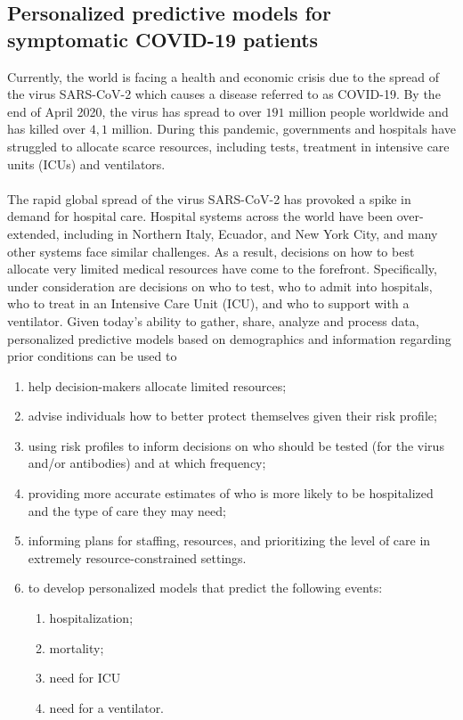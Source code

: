 \documentclass[11pt,a4paper]{article}
\begin{document}
\subsection{Personalized predictive models for symptomatic COVID-19 patients}
Currently, the world is facing a health and economic crisis due to the spread of
the virus SARS-CoV-2 which causes a disease referred to as COVID-19. By the end
of April 2020, the virus has spread to over $191$ million people worldwide and
has killed over $4,1$ million. During this pandemic, governments and hospitals
have struggled to allocate scarce resources, including tests, treatment in
intensive care units (ICUs) and ventilators.\\
\\
The rapid global spread of the virus SARS-CoV-2 has provoked a spike in demand
for hospital care. Hospital systems across the world have been over-extended,
including in Northern Italy, Ecuador, and New York City, and many other systems
face similar challenges. As a result, decisions on how to best allocate very
limited medical resources have come to the forefront. Specifically, under
consideration are decisions on who to test, who to admit into hospitals, who to
treat in an Intensive Care Unit (ICU), and who to support with a ventilator.
Given today's ability to gather, share, analyze and process data, personalized
predictive models based on demographics and information regarding prior
conditions can be used to
\begin{enumerate}
    \item help decision-makers allocate limited resources;
    \item advise individuals how to better protect themselves given their risk
    profile;
    \item using risk profiles to inform decisions on who should be tested (for
    the virus and/or antibodies) and at which frequency;
    \item providing more accurate estimates of who is more likely to be
    hospitalized and the type of care they may need;
    \item informing plans for staffing, resources, and prioritizing the level of
    care in extremely resource-constrained settings.
    \item to develop personalized models that predict the following events:
        \begin{enumerate}
            \item hospitalization;
            \item mortality;
            \item need for ICU
            \item need for a ventilator.
        \end{enumerate}
\end{enumerate}
\end{document}
